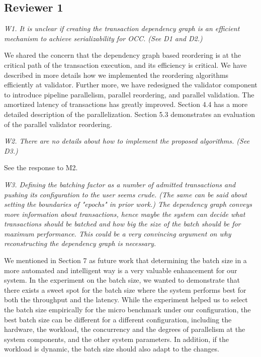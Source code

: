 \documentclass{article}
\begin{document}
\subsection{Reviewer 1}

\emph{W1. It is unclear if creating the transaction dependency graph is an efficient mechanism to achieve serializability for OCC. (See D1 and D2.)}

We shared the concern that the dependency graph based reordering is at the critical path of the transaction execution, and its efficiency is critical. We have described in more details how we implemented the reordering algorithms efficiently at validator. Further more, we have redesigned the validator component to introduce pipeline parallelism, parallel reordering, and parallel validation. The amortized latency of transactions has greatly improved. Section 4.4 has a more detailed description of the parallelization. Section 5.3 demonstrates an evaluation of the parallel validator reordering.

\emph{W2. There are no details about how to implement the proposed algorithms. (See D3.)}

See the response to M2.

\emph{W3. Defining the batching factor as a number of admitted transactions and pushing its configuration to the user seems crude. (The same can be said about setting the boundaries of "epochs" in prior work.) The dependency graph conveys more information about transactions, hence maybe the system can decide what transactions should be batched and how big the size of the batch should be for maximum performance. This could be a very convincing argument on why reconstructing the dependency graph is necessary.}

We mentioned in Section 7 as future work that determining the batch size in a more automated and intelligent way is a very valuable enhancement for our system. In the experiment on the batch size, we wanted to demonstrate that there exists a sweet spot for the batch size where the system performs best for both the throughput and the latency. While the experiment helped us to select the batch size empirically for the micro benchmark under our configuration, the best batch size can be different for a different configuration, including the hardware, the workload, the concurrency and the degrees of parallelism at the system components, and the other system parameters. In addition, if the workload is dynamic, the batch size should also adapt to the changes.
\end{document}
